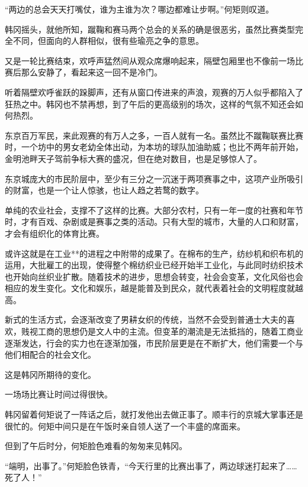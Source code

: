 “两边的总会天天打嘴仗，谁为主谁为次？哪边都难让步啊。”何矩则叹道。 

韩冈摇头，就他所知，蹴鞠和赛马两个总会的关系的确是很恶劣，虽然比赛类型完全不同，但面向的人群相似，很有些瑜亮之争的意思。 

又是一轮比赛结束，欢呼声猛然间从观众席爆响起来，隔壁包厢里也不像前一场比赛后那么安静了，看起来这一回不是冷门。 

听着隔壁欢呼雀跃的跺脚声，还有从窗口传进来的声浪，观赛的万人似乎都陷入了狂热之中。韩冈也不禁再想，到了午后的更高级别的场次，这样的气氛不知还会如何热烈。 

东京百万军民，来此观赛的有万人之多，一百人就有一名。虽然比不蹴鞠联赛比赛时，一个坊中的男女老幼全体出动，为本坊的球队加油助威；也比不两年前开始，金明池畔天子驾前争标大赛的盛况，但在绝对数目，也是足够惊人了。 

东京城庞大的市民阶层中，至少有三分之一沉迷于两项赛事之中，这项产业所吸引的财富，也是一个让人惊骇，也让人趋之若鹜的数字。 

单纯的农业社会，支撑不了这样的比赛。大部分农村，只有一年一度的社赛和年节时，才有百戏、杂剧或是赛事之类的活动。只有大型的城市，大量的人口和财富，才会有组织化的体育比赛。 

或许这就是在工业**的进程之中附带的成果了。在棉布的生产，纺纱机和织布机的运用，大批雇工的出现，使得整个棉纺织业已经开始半工业化，与此同时纺织技术也开始向丝织业扩散。随着技术的进步，思想会转变，社会会变革，文化风俗也会相应的发生变化。文化和娱乐，越是能普及到民众，就代表着社会的文明程度就越高。 

新式的生活方式，会逐渐改变了男耕女织的传统，当然不会受到普通士大夫的喜欢，贱视工商的思想仍是文人中的主流。但变革的潮流是无法抵挡的，随着工商业逐渐发达，行会的实力也在逐渐加强，市民阶层更是在不断扩大，他们需要一个与他们相配合的社会文化。 

这是韩冈所期待的变化。 

一场场比赛让时间过得很快。 

韩冈留着何矩说了一阵话之后，就打发他出去做正事了。顺丰行的京城大掌事还是很忙的。何矩中间只是在午饭时亲自领人送了一个丰盛的席面来。 

但到了午后时分，何矩脸色难看的匆匆来见韩冈。 

“端明，出事了。”何矩脸色铁青，“今天行里的比赛出事了，两边球迷打起来了……死了人！”